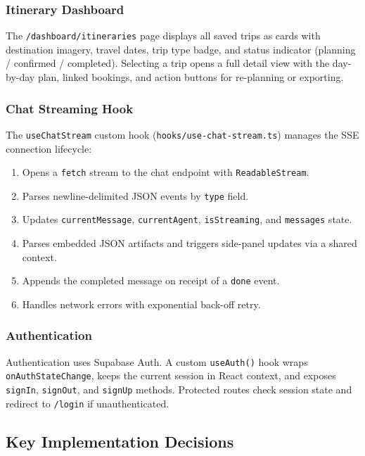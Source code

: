 \documentclass[12pt, a4paper]{article}
\begin{document}
\subsubsection{Itinerary Dashboard}

The \texttt{/dashboard/itineraries} page displays all saved trips as cards with destination imagery, travel dates, trip type badge, and status indicator (planning / confirmed / completed). Selecting a trip opens a full detail view with the day-by-day plan, linked bookings, and action buttons for re-planning or exporting.

\subsubsection{Chat Streaming Hook}

The \texttt{useChatStream} custom hook (\texttt{hooks/use-chat-stream.ts}) manages the SSE connection lifecycle:

\begin{enumerate}[leftmargin=1.5cm, itemsep=0.3em]
  \item Opens a \texttt{fetch} stream to the chat endpoint with \texttt{ReadableStream}.
  \item Parses newline-delimited JSON events by \texttt{type} field.
  \item Updates \texttt{currentMessage}, \texttt{currentAgent}, \texttt{isStreaming}, and \texttt{messages} state.
  \item Parses embedded JSON artifacts and triggers side-panel updates via a shared context.
  \item Appends the completed message on receipt of a \texttt{done} event.
  \item Handles network errors with exponential back-off retry.
\end{enumerate}

\subsubsection{Authentication}

Authentication uses Supabase Auth. A custom \texttt{useAuth()} hook wraps \texttt{onAuthStateChange}, keeps the current session in React context, and exposes \texttt{signIn}, \texttt{signOut}, and \texttt{signUp} methods. Protected routes check session state and redirect to \texttt{/login} if unauthenticated.

\subsection{Key Implementation Decisions}
\end{document}

